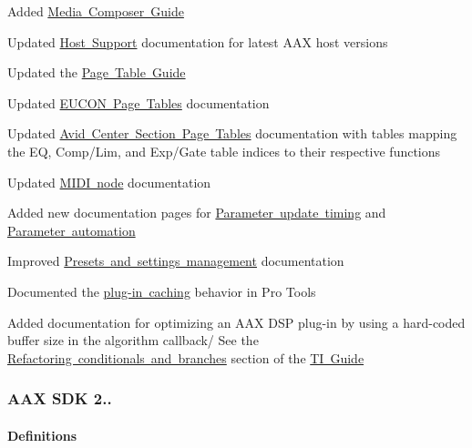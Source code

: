 \begin{DoxyItemize}
\item Added \mbox{\hyperlink{a00831}{Media Composer Guide}} 
\item Updated \mbox{\hyperlink{a00845}{Host Support}} documentation for latest A\+AX host versions 
\item Updated the \mbox{\hyperlink{a00833}{Page Table Guide}} 
\begin{DoxyItemize}
\item Updated \mbox{\hyperlink{a00833_aax_page_table_guide__eucon_page_tables}{E\+U\+C\+ON Page Tables}} documentation 
\item Updated \mbox{\hyperlink{a00833_aax_page_table_guide_04_avid_center_section_page_tables}{Avid Center Section Page Tables}} documentation with tables mapping the EQ, Comp/\+Lim, and Exp/\+Gate table indices to their respective functions 
\end{DoxyItemize}
\item Updated \mbox{\hyperlink{a00491_a5e1dffce35d05990dbbad651702678e4}{M\+I\+DI node}} documentation 
\item Added new documentation pages for \mbox{\hyperlink{a00821}{Parameter update timing}} and \mbox{\hyperlink{a00819}{Parameter automation}} 
\item Improved \mbox{\hyperlink{a00830_subsection__presets_and_settings_management}{Presets and settings management}} documentation 
\item Documented the \mbox{\hyperlink{a00830_subsubsection__plugin_configuration_cacheing_}{plug-\/in caching}} behavior in Pro Tools 
\item Added documentation for optimizing an A\+AX D\+SP plug-\/in by using a hard-\/coded buffer size in the algorithm callback/ See the \mbox{\hyperlink{a00832_subsection__refactoring_conditionals_and_branches}{Refactoring conditionals and branches}} section of the \mbox{\hyperlink{a00832}{TI Guide}} 
\end{DoxyItemize}\hypertarget{a00847_aax_sdk_2p1p1}{}\subsubsection{A\+A\+X S\+D\+K 2..}\label{a00847_aax_sdk_2p1p1}
\hypertarget{a00847_aax_sdk_2p1p1_Definitions}{}\paragraph{Definitions}\label{a00847_aax_sdk_2p1p1_Definitions}

